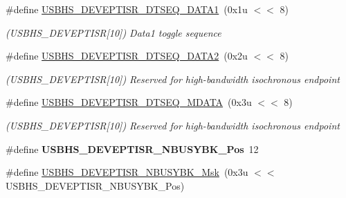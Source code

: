 \begin{DoxyCompactItemize}
\mbox{\label{group__SAMS70__USBHS_ga80408964fc89b049ba2ba0d502597d9d}} 
\#define \mbox{\hyperlink{group__SAMS70__USBHS_ga80408964fc89b049ba2ba0d502597d9d}{U\+S\+B\+H\+S\+\_\+\+D\+E\+V\+E\+P\+T\+I\+S\+R\+\_\+\+D\+T\+S\+E\+Q\+\_\+\+D\+A\+T\+A1}}~(0x1u $<$$<$ 8)
\begin{DoxyCompactList}\small\item\em (U\+S\+B\+H\+S\+\_\+\+D\+E\+V\+E\+P\+T\+I\+SR\mbox{[}10\mbox{]}) Data1 toggle sequence \end{DoxyCompactList}\item 
\mbox{\label{group__SAMS70__USBHS_gad21f23dbbe4b746cb9b0bbf10ee091f0}} 
\#define \mbox{\hyperlink{group__SAMS70__USBHS_gad21f23dbbe4b746cb9b0bbf10ee091f0}{U\+S\+B\+H\+S\+\_\+\+D\+E\+V\+E\+P\+T\+I\+S\+R\+\_\+\+D\+T\+S\+E\+Q\+\_\+\+D\+A\+T\+A2}}~(0x2u $<$$<$ 8)
\begin{DoxyCompactList}\small\item\em (U\+S\+B\+H\+S\+\_\+\+D\+E\+V\+E\+P\+T\+I\+SR\mbox{[}10\mbox{]}) Reserved for high-\/bandwidth isochronous endpoint \end{DoxyCompactList}\item 
\mbox{\label{group__SAMS70__USBHS_ga568eb6f4113642173ebcf3c303ad086e}} 
\#define \mbox{\hyperlink{group__SAMS70__USBHS_ga568eb6f4113642173ebcf3c303ad086e}{U\+S\+B\+H\+S\+\_\+\+D\+E\+V\+E\+P\+T\+I\+S\+R\+\_\+\+D\+T\+S\+E\+Q\+\_\+\+M\+D\+A\+TA}}~(0x3u $<$$<$ 8)
\begin{DoxyCompactList}\small\item\em (U\+S\+B\+H\+S\+\_\+\+D\+E\+V\+E\+P\+T\+I\+SR\mbox{[}10\mbox{]}) Reserved for high-\/bandwidth isochronous endpoint \end{DoxyCompactList}\item 
\mbox{\label{group__SAMS70__USBHS_gaa83d9b1cf59f18b0740871ce1541b398}} 
\#define {\bfseries U\+S\+B\+H\+S\+\_\+\+D\+E\+V\+E\+P\+T\+I\+S\+R\+\_\+\+N\+B\+U\+S\+Y\+B\+K\+\_\+\+Pos}~12
\item 
\mbox{\label{group__SAMS70__USBHS_ga4119a6fbd21e0fa7cdc7260da0996337}} 
\#define \mbox{\hyperlink{group__SAMS70__USBHS_ga4119a6fbd21e0fa7cdc7260da0996337}{U\+S\+B\+H\+S\+\_\+\+D\+E\+V\+E\+P\+T\+I\+S\+R\+\_\+\+N\+B\+U\+S\+Y\+B\+K\+\_\+\+Msk}}~(0x3u $<$$<$ U\+S\+B\+H\+S\+\_\+\+D\+E\+V\+E\+P\+T\+I\+S\+R\+\_\+\+N\+B\+U\+S\+Y\+B\+K\+\_\+\+Pos)

\end{DoxyCompactItemize}
